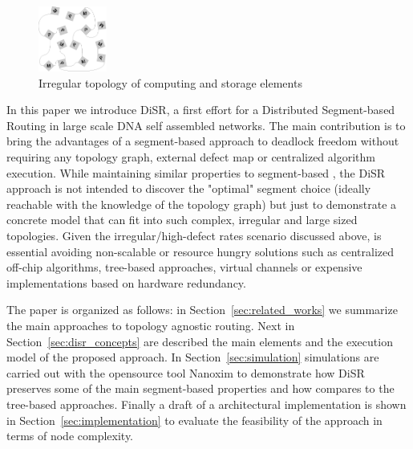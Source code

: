 \begin{figure}
  \centering
    \includegraphics[width=0.20\textwidth]{pictures/dna1.eps}
  \caption{Irregular topology of computing and storage elements}
  \label{fig:nana}
\end{figure}

In this paper we introduce DiSR, a first effort for a Distributed
Segment-based Routing in large scale DNA self assembled networks.
The main contribution is to bring the advantages of
a segment-based approach to deadlock freedom without requiring any topology graph,
external defect map or centralized algorithm execution. 
While maintaining similar properties to segment-based , the DiSR
approach is not intended to discover the "optimal" segment choice
(ideally reachable with the knowledge of the topology graph) but just
to demonstrate a concrete model that can fit into such complex,
irregular and large sized topologies.
Given the irregular/high-defect rates scenario discussed above, is essential
avoiding non-scalable or resource hungry solutions such as
centralized off-chip algorithms, tree-based approaches, virtual channels
or expensive implementations based on hardware redundancy.

The paper is organized as follows: in Section~\ref{sec:related_works}
we summarize the main approaches to topology agnostic routing. Next in
Section~\ref{sec:disr_concepts} are described the main elements and
the execution model of the proposed approach.  In Section~\ref{sec:simulation}
simulations are carried out with the opensource tool Nanoxim to
demonstrate how DiSR preserves some of the main segment-based
properties and how compares to the tree-based approaches. Finally a
draft of a architectural implementation is shown in
Section~\ref{sec:implementation} to evaluate the feasibility of the
approach in terms of node complexity.


